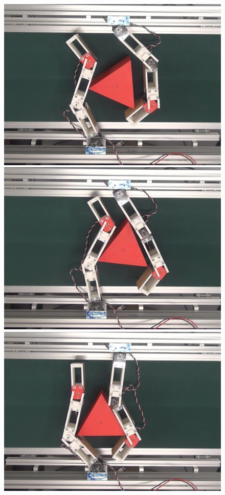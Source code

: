 \documentclass[a4paper,papersize,dvipdfmx]{mtabst}
\begin{document}
\begin{figure}[t]
\begin{minipage}{0.249\linewidth}
\centering
\includegraphics[width=0.9\linewidth]{fig/4-manipulation-result/Triangle/2-1.jpg}
\end{minipage}\hfill
\begin{minipage}{0.249\linewidth}
\centering
\includegraphics[width=0.9\linewidth]{fig/4-manipulation-result/Triangle/2-2.jpg}
\end{minipage}\hfill
\begin{minipage}{0.249\linewidth}
\centering
\includegraphics[width=0.9\linewidth]{fig/4-manipulation-result/Triangle/2-3.jpg}

\end{minipage}
\end{figure}
\end{document}
